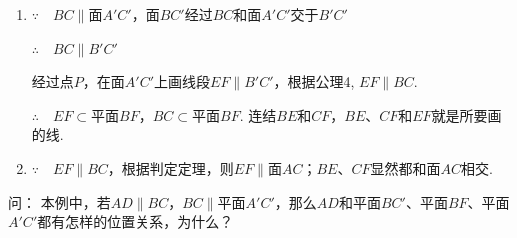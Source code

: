 \begin{solution}
\begin{enumerate}[(1)]
    \item $\because\quad BC\parallel $面$A'C'$，面$BC'$经过$BC$和面$A'C'$交于$B'C'$

$\therefore\quad BC\parallel B'C'$

经过点$P$，在面$A'C'$上画线段$EF\parallel B'C'$，根据公理4, $EF\parallel BC$.

$\therefore\quad EF\subset$平面$BF$，$BC\subset$平面$BF$. 连结$BE$和$CF$，$BE$、$CF$和$EF$就是所要画的线.

\item $\because\quad EF\parallel BC$，根据判定定理，则$EF\parallel $面$AC$；$BE$、$CF$显然都和面$AC$相交.
\end{enumerate}
\end{solution}

\begin{thm}{问：}
    本例中，若$AD\parallel BC$，$BC\parallel $平面$A'C'$，那么$AD$和平面$BC'$、平面$BF$、平面$A'C'$都有怎样的位置关系，为什么？
\end{thm}

